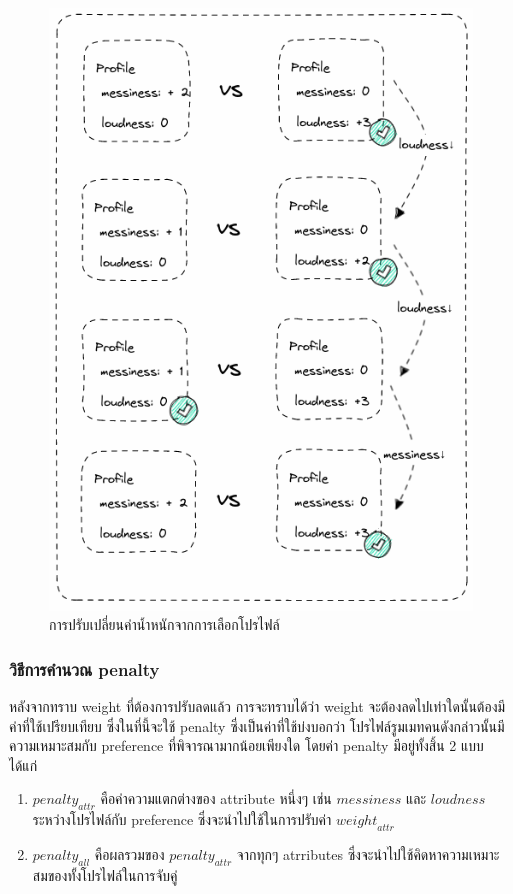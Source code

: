 \begin{figure}[p]
  \begin{center}
    \includegraphics[width=\linewidth]{photo/diagram/weight_adjustment.png}
  \end{center}
  \caption{การปรับเปลี่ยนค่าน้ำหนักจากการเลือกโปรไฟล์}
  \label{fig:weight-adjust}
\end{figure}

\subsubsection{วิธีการคำนวณ penalty}
หลังจากทราบ weight ที่ต้องการปรับลดแล้ว การจะทราบได้ว่า weight จะต้องลดไปเท่าใดนั้นต้องมีค่าที่ใช้เปรียบเทียบ ซึ่งในที่นี้จะใช้ penalty
ซึ่งเป็นค่าที่ใช้บ่งบอกว่า โปรไฟล์รูมเมทคนดังกล่าวนั้นมีความเหมาะสมกับ preference ที่พิจารณามากน้อยเพียงใด
โดยค่า penalty มีอยู่ทั้งสิ้น 2 แบบ ได้แก่
\begin{enumerate}
  \item $\mathit{penalty}_\mathit{attr}$ คือค่าความแตกต่างของ attribute หนึ่งๆ เช่น $\mathit{messiness}$ และ $\mathit{loudness}$ ระหว่างโปรไฟล์กับ preference ซึ่งจะนำไปใช้ในการปรับค่า $\mathit{weight}_\mathit{attr}$
  \item $\mathit{penalty}_\mathit{all}$ คือผลรวมของ $\mathit{penalty}_\mathit{attr}$ จากทุกๆ atrributes ซึ่งจะนำไปใช้คิดหาความเหมาะสมของทั้งโปรไฟล์ในการจับคู่
\end{enumerate}


